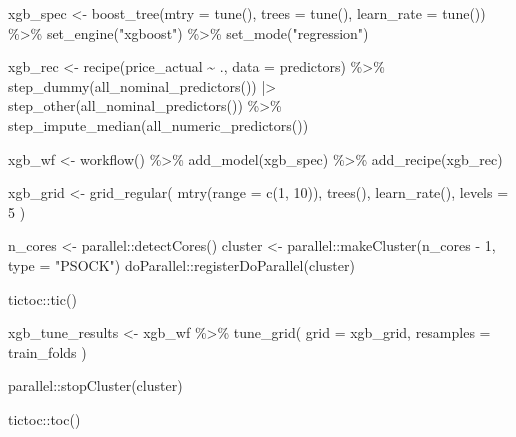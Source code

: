 \documentclass[
]{article}
\newenvironment{Shaded}{\begin{snugshade}}{\end{snugshade}}
\newcommand{\AttributeTok}[1]{\textcolor[rgb]{0.40,0.45,0.13}{#1}}
\newcommand{\DecValTok}[1]{\textcolor[rgb]{0.68,0.00,0.00}{#1}}
\newcommand{\FunctionTok}[1]{\textcolor[rgb]{0.28,0.35,0.67}{#1}}
\newcommand{\NormalTok}[1]{\textcolor[rgb]{0.00,0.23,0.31}{#1}}
\newcommand{\OtherTok}[1]{\textcolor[rgb]{0.00,0.23,0.31}{#1}}
\newcommand{\SpecialCharTok}[1]{\textcolor[rgb]{0.37,0.37,0.37}{#1}}
\newcommand{\StringTok}[1]{\textcolor[rgb]{0.13,0.47,0.30}{#1}}
\begin{document}
\begin{Shaded}
\begin{Highlighting}[]
\NormalTok{xgb\_spec }\OtherTok{\textless{}{-}} \FunctionTok{boost\_tree}\NormalTok{(}\AttributeTok{mtry =} \FunctionTok{tune}\NormalTok{(), }\AttributeTok{trees =} \FunctionTok{tune}\NormalTok{(), }\AttributeTok{learn\_rate =} \FunctionTok{tune}\NormalTok{()) }\SpecialCharTok{\%\textgreater{}\%}
  \FunctionTok{set\_engine}\NormalTok{(}\StringTok{"xgboost"}\NormalTok{) }\SpecialCharTok{\%\textgreater{}\%}
  \FunctionTok{set\_mode}\NormalTok{(}\StringTok{"regression"}\NormalTok{)}

\NormalTok{xgb\_rec }\OtherTok{\textless{}{-}} \FunctionTok{recipe}\NormalTok{(price\_actual }\SpecialCharTok{\textasciitilde{}}\NormalTok{ ., }\AttributeTok{data =}\NormalTok{ predictors) }\SpecialCharTok{\%\textgreater{}\%}
  \FunctionTok{step\_dummy}\NormalTok{(}\FunctionTok{all\_nominal\_predictors}\NormalTok{()) }\SpecialCharTok{|\textgreater{}}
  \FunctionTok{step\_other}\NormalTok{(}\FunctionTok{all\_nominal\_predictors}\NormalTok{()) }\SpecialCharTok{\%\textgreater{}\%}
  \FunctionTok{step\_impute\_median}\NormalTok{(}\FunctionTok{all\_numeric\_predictors}\NormalTok{())}

\NormalTok{xgb\_wf }\OtherTok{\textless{}{-}} \FunctionTok{workflow}\NormalTok{() }\SpecialCharTok{\%\textgreater{}\%}
  \FunctionTok{add\_model}\NormalTok{(xgb\_spec) }\SpecialCharTok{\%\textgreater{}\%}
  \FunctionTok{add\_recipe}\NormalTok{(xgb\_rec)}

\NormalTok{xgb\_grid }\OtherTok{\textless{}{-}} \FunctionTok{grid\_regular}\NormalTok{(}
  \FunctionTok{mtry}\NormalTok{(}\AttributeTok{range =} \FunctionTok{c}\NormalTok{(}\DecValTok{1}\NormalTok{, }\DecValTok{10}\NormalTok{)),}
  \FunctionTok{trees}\NormalTok{(),}
  \FunctionTok{learn\_rate}\NormalTok{(),}
  \AttributeTok{levels =} \DecValTok{5}
\NormalTok{)}

\NormalTok{n\_cores }\OtherTok{\textless{}{-}}\NormalTok{ parallel}\SpecialCharTok{::}\FunctionTok{detectCores}\NormalTok{()}
\NormalTok{cluster }\OtherTok{\textless{}{-}}\NormalTok{ parallel}\SpecialCharTok{::}\FunctionTok{makeCluster}\NormalTok{(n\_cores }\SpecialCharTok{{-}} \DecValTok{1}\NormalTok{, }\AttributeTok{type =} \StringTok{"PSOCK"}\NormalTok{)}
\NormalTok{doParallel}\SpecialCharTok{::}\FunctionTok{registerDoParallel}\NormalTok{(cluster)}

\NormalTok{tictoc}\SpecialCharTok{::}\FunctionTok{tic}\NormalTok{()}

\NormalTok{xgb\_tune\_results }\OtherTok{\textless{}{-}}\NormalTok{ xgb\_wf }\SpecialCharTok{\%\textgreater{}\%}
  \FunctionTok{tune\_grid}\NormalTok{(}
    \AttributeTok{grid =}\NormalTok{ xgb\_grid,}
    \AttributeTok{resamples =}\NormalTok{ train\_folds}
\NormalTok{  )}

\NormalTok{parallel}\SpecialCharTok{::}\FunctionTok{stopCluster}\NormalTok{(cluster)}

\NormalTok{tictoc}\SpecialCharTok{::}\FunctionTok{toc}\NormalTok{()}
\end{Highlighting}
\end{Shaded}
\end{document}
